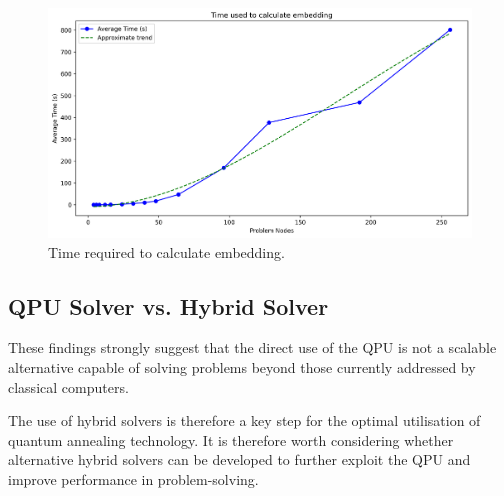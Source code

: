 \begin{figure}[H] 
	\centering 
	\includegraphics[width=\textwidth]{figures/scale_time.png} 	
	\caption{Time required to calculate embedding.} 
	\label{fig:scale_time}
\end{figure}

\subsection{QPU Solver vs. Hybrid Solver}

These findings strongly suggest that the direct use of the QPU is not a scalable alternative capable of solving problems beyond those currently addressed by classical computers.

The use of hybrid solvers is therefore a key step for the optimal utilisation of quantum annealing technology. 
It is therefore worth considering whether alternative hybrid solvers can be developed to further exploit the QPU and improve performance in problem-solving.
